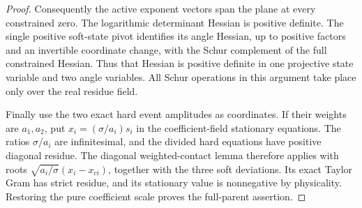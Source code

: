 \begin{proof}
Consequently the active exponent vectors span the plane at every constrained zero. The logarithmic determinant Hessian is positive definite. The single positive soft-state pivot identifies its angle Hessian, up to positive factors and an invertible coordinate change, with the Schur complement of the full constrained Hessian. Thus that Hessian is positive definite in one projective state variable and two angle variables. All Schur operations in this argument take place only over the real residue field.

Finally use the two exact hard event amplitudes as coordinates. If their weights are $a_1,a_2$, put $x_i=(\sigma/a_i)s_i$ in the coefficient-field stationary equations. The ratios $\sigma/a_i$ are infinitesimal, and the divided hard equations have positive diagonal residue. The diagonal weighted-contact lemma therefore applies with roots $\sqrt{a_i/\sigma}(x_i-x_{ci})$, together with the three soft deviations. Its exact Taylor Gram has strict residue, and its stationary value is nonnegative by physicality. Restoring the pure coefficient scale proves the full-parent assertion.
\end{proof}
